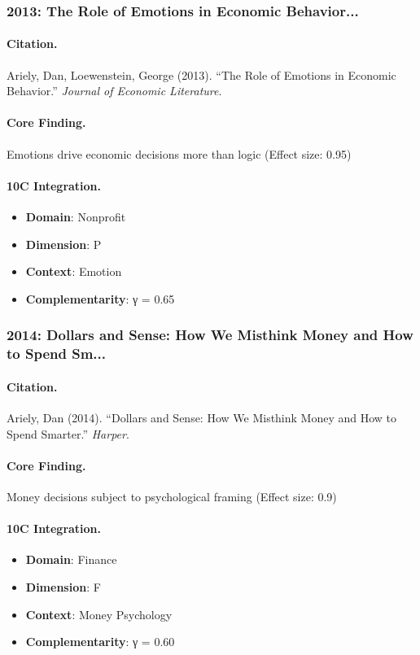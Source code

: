 \subsubsection{2013: The Role of Emotions in Economic Behavior...}

\paragraph{Citation.}
Ariely, Dan, Loewenstein, George (2013). ``The Role of Emotions in Economic Behavior.''
\textit{Journal of Economic Literature}.

\paragraph{Core Finding.}
Emotions drive economic decisions more than logic (Effect size: 0.95)

\paragraph{10C Integration.}
\begin{itemize}[nosep]
  \item \textbf{Domain}: Nonprofit
  \item \textbf{Dimension}: P
  \item \textbf{Context}: Emotion
  \item \textbf{Complementarity}: γ = 0.65
\end{itemize}

\subsubsection{2014: Dollars and Sense: How We Misthink Money and How to Spend Sm...}

\paragraph{Citation.}
Ariely, Dan (2014). ``Dollars and Sense: How We Misthink Money and How to Spend Smarter.''
\textit{Harper}.

\paragraph{Core Finding.}
Money decisions subject to psychological framing (Effect size: 0.9)

\paragraph{10C Integration.}
\begin{itemize}[nosep]
  \item \textbf{Domain}: Finance
  \item \textbf{Dimension}: F
  \item \textbf{Context}: Money Psychology
  \item \textbf{Complementarity}: γ = 0.60
\end{itemize}

